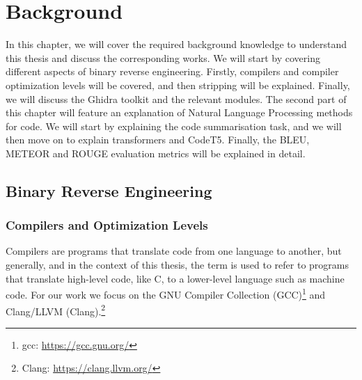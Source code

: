 \chapter{Background}
\label{background}



In this chapter, we will cover the required background knowledge to understand this thesis and discuss the corresponding works. We will start by covering different aspects of binary reverse engineering. Firstly, compilers and compiler optimization levels will be covered, and then stripping will be explained. Finally, we will discuss the Ghidra toolkit and the relevant modules. The second part of this chapter will feature an explanation of Natural Language Processing methods for code. We will start by explaining the code summarisation task, and we will then move on to explain transformers and CodeT5. Finally, the BLEU, METEOR and ROUGE evaluation metrics will be explained in detail.
\section{Binary Reverse Engineering}

\subsection{Compilers and Optimization Levels}
Compilers are programs that translate code from one language to another, but generally, and in the context of this thesis, the term is used to refer to programs that translate high-level code, like C, to a lower-level language such as machine code. For our work we focus on the GNU Compiler Collection (GCC)\footnote{gcc: \url{https://gcc.gnu.org/}} and Clang/LLVM (Clang).\footnote{Clang: \url{https://clang.llvm.org/}}

